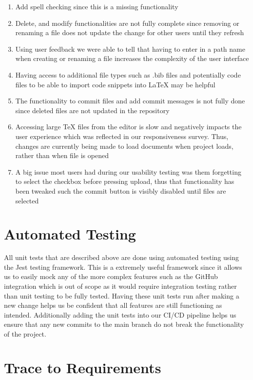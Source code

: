 \documentclass[12pt, titlepage]{article}
\begin{document}
	\begin{enumerate}
		\item Add spell checking since this is a missing functionality\
		\item Delete, and modify functionalities are not fully complete since removing or renaming a file does not update the change for other users until they refresh
		\item Using user feedback we were able to tell that having to enter in a path name when creating or renaming a file increases the complexity of the user interface
		\item Having access to additional file types such as .bib files and potentially code files to be able to import code snippets into LaTeX may be helpful
		\item The functionality to commit files and add commit messages is not fully done since deleted files are not updated in the repository
		\item Accessing large TeX files from the editor is slow and negatively impacts the user experience which was reflected in our responsiveness survey. Thus, changes are currently being made to load documents when project loads, rather than when file is opened
		\item A big issue most users had during our usability testing was them forgetting to select the checkbox before pressing upload, thus that functionality has been tweaked such the commit button is visibly disabled until files are selected
	\end{enumerate}
	
	\section{Automated Testing}
	
	All unit tests that are described above are done using automated testing using the Jest testing framework. This is a extremely useful framework since it allows us to easily mock any of the more complex features such as the GitHub integration which is out of scope as it would require integration testing rather than unit testing to be fully tested. Having these unit tests run after making a new change helps us be confident that all features are still functioning as intended. Additionally adding the unit tests into our CI/CD pipeline helps us ensure that any new commits to the main branch do not break the functionality of the project.
	
	\newpage
	
	\section{Trace to Requirements}
	
\end{document}
